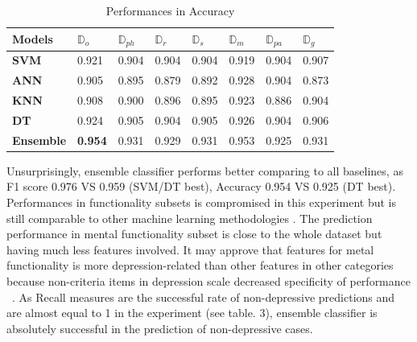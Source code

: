 \documentclass[10pt,journal,compsoc]{IEEEtran}
\begin{document}
\begin{table}[ht]
\begin{adjustwidth}{-1cm}{}
\begin{tabular}{|C{1.4cm}|C{0.7cm}|C{0.7cm}|C{0.7cm}|C{0.7cm}|C{0.7cm}|C{0.7cm}|C{0.7cm}|}
\hline
{} 
{\color[HTML]{000000} \textbf{Models}} & {\color[HTML]{000000} \textbf{$\mathbb{D}_{o}$}} & {\color[HTML]{000000} \textbf{$\mathbb{D}_{ph}$}} & {\color[HTML]{000000} \textbf{$\mathbb{D}_{r}$}} & {\color[HTML]{000000} \textbf{$\mathbb{D}_{s}$}} & {\color[HTML]{000000} \textbf{$\mathbb{D}_{m}$}} & {\color[HTML]{000000} \textbf{$\mathbb{D}_{pa}$}} & {\color[HTML]{000000} \textbf{$\mathbb{D}_{g}$}} \\ \hline
{} 
\textbf{SVM} & 0.921  &0.904 & 0.904 & 0.904 & 0.919 & 0.904  & 0.907  \\ \hline
{} 
\textbf{ANN} & 0.905 & 0.895 & 0.879 & 0.892 & 0.928 & 0.904 & 0.873 \\ \hline
{} 
\textbf{KNN} & 0.908  & 0.900 & 0.896 & 0.895 & 0.923 & 0.886 & 0.904 \\ \hline
{} 
\textbf{DT} & 0.924 & 0.905 & 0.904  & 0.905 & 0.926 & 0.904 & 0.906 \\ \hline
{} 
\textbf{Ensemble} & \textbf{0.954} & 0.931 & 0.929  & 0.931  & 0.953 & 0.925 & 0.931  \\ \hline
\end{tabular}
\caption{Performances in Accuracy}
\label{Accuracy}
\end{adjustwidth}
\end{table}

Unsurprisingly, ensemble classifier performs better comparing to all baselines, as F1 score 0.976 VS 0.959 (SVM/DT best), Accuracy 0.954 VS 0.925 (DT best). Performances in functionality subsets is compromised in this experiment but is still comparable to other machine learning methodologies \cite{Fatima}\cite{Hassan}\cite{Peng}\cite{Reece}. The prediction performance in mental functionality subset is close to the whole dataset but having much less features involved. It may approve that features for metal functionality is more depression-related than other features in other categories because non-criteria items in depression scale decreased specificity of performance ~\cite{Zimmerman}. As Recall measures are the successful rate of non-depressive predictions and are almost equal to 1 in the experiment (see table. 3), ensemble classifier is absolutely successful in the prediction of non-depressive cases.
%
%
\end{document}
